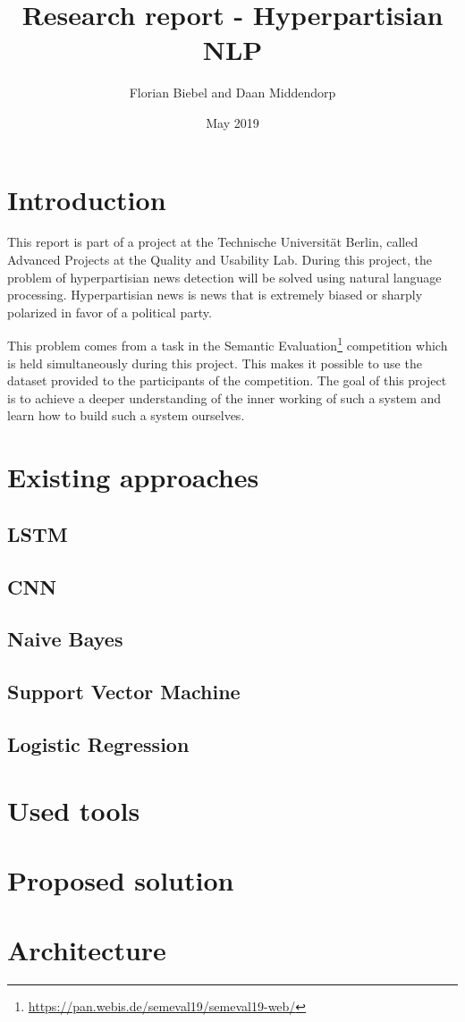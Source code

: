 \documentclass{article}
\title{Research report - Hyperpartisian NLP}
\author{Florian Biebel and Daan Middendorp}
\date{May 2019}
\begin{document}
\maketitle

\section{Introduction}
This report is part of a project at the Technische Universität Berlin, called Advanced Projects at the Quality and Usability Lab. During this project, the problem of hyperpartisian news detection will be solved using natural language processing. Hyperpartisian news is news that is extremely biased or sharply polarized in favor of a political party. 

This problem comes from a task in the Semantic Evaluation\footnote{\url{https://pan.webis.de/semeval19/semeval19-web/}} competition which is held simultaneously during this project. This makes it possible to use the dataset provided to the participants of the competition. The goal of this project is to achieve a deeper understanding of the inner working of such a system and learn how to build such a system ourselves.

\section{Existing approaches}
\subsection{LSTM}
\subsection{CNN}
\subsection{Naive Bayes}
\subsection{Support Vector Machine}
\subsection{Logistic Regression}

\section{Used tools}

\section{Proposed solution}

\section{Architecture}
\end{document}
